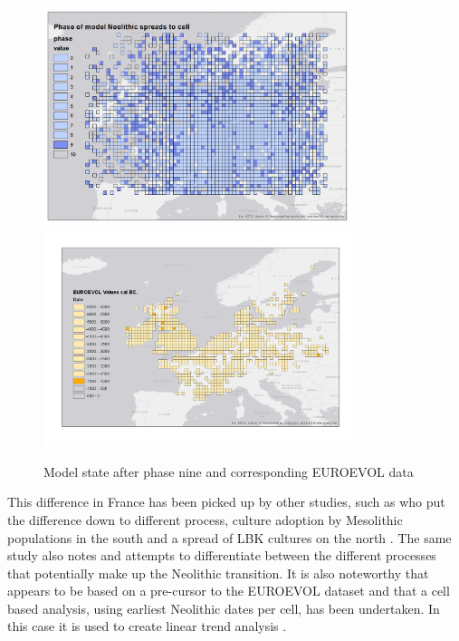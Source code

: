 \begin{figure}
\centering
	\includegraphics[width=0.8\textwidth]{figures/model-9}
	\includegraphics[width=0.8\textwidth]{figures/euroevol-9}
  \caption{Model state after phase nine and corresponding EUROEVOL data}
  \label{fig:compare9}
\end{figure}

This difference in France has been picked up by other studies, such as \citet{gkiasta2003neolithic} who put the difference down to different process, culture adoption by Mesolithic populations in the south and a spread of LBK cultures on the north \citep[60]{gkiasta2003neolithic}. The same study also notes and attempts to differentiate between the different processes that potentially make up the Neolithic transition. It is also noteworthy that \citet{gkiasta2003neolithic} appears to be based on a pre-cursor to the EUROEVOL dataset and that a cell based analysis, using earliest Neolithic dates per cell, has been undertaken. In this case it is used to create linear trend analysis \citep[54]{gkiasta2003neolithic}.

